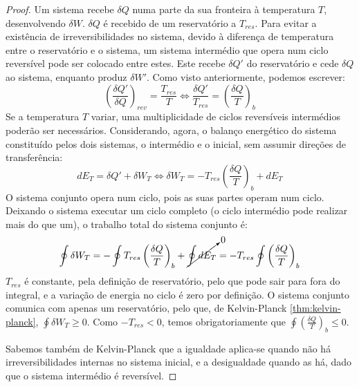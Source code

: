 \begin{proof}
    Um sistema recebe $\delta Q$ numa parte da sua fronteira à temperatura $T$, desenvolvendo $\delta W$. $\delta Q$ é recebido de um reservatório a $T_{res}$. Para evitar a existência de irreversibilidades no sistema, devido à diferença de temperatura entre o reservatório e o sistema, um sistema intermédio que opera num ciclo reversível pode ser colocado entre estes. Este recebe $\delta Q'$ do reservatório e cede $\delta Q$ ao sistema, enquanto produz $\delta W'$.
    Como visto anteriormente, podemos escrever:
    \begin{equation*}
        \left( \frac{\delta Q'}{\delta Q} \right)_{rev} = \frac{T_{res}}{T} \Longleftrightarrow \frac{\delta Q'}{T_{res}} = \left( \frac{\delta Q}{T} \right)_b
    \end{equation*}
    Se a temperatura $T$ variar, uma multiplicidade de ciclos reversíveis intermédios poderão ser necessários.
    Considerando, agora, o balanço energético do sistema constituído pelos dois sistemas, o intermédio e o inicial, sem assumir direções de transferência:
    \begin{equation*}
        d E_T = \delta Q' + \delta W_T \Longleftrightarrow \delta W_T = - T_{res} \left( \frac{\delta Q}{T} \right)_b + d E_T
    \end{equation*}
    O sistema conjunto opera num ciclo, pois as suas partes operam num ciclo. Deixando o sistema executar um ciclo completo (o ciclo intermédio pode realizar mais do que um), o trabalho total do sistema conjunto é:
    \begin{equation*}
        \oint \delta W_T = - \oint T_{res} \left( \frac{\delta Q}{T} \right)_b + \cancelto{0}{\oint d E_T} = - T_{res} \oint \left( \frac{\delta Q}{T} \right)_b
    \end{equation*}
    $T_{res}$ é constante, pela definição de reservatório, pelo que pode sair para fora do integral, e a variação de energia no ciclo é zero por definição.
    O sistema conjunto comunica com apenas um reservatório, pelo que, de Kelvin-Planck \autoref{thm:kelvin-planck}, $\oint \delta W_T \geq 0$. Como $- T_{res} < 0$, temos obrigatoriamente que $\oint \left( \frac{\delta Q}{T} \right)_b \leq 0$.
    
    Sabemos também de Kelvin-Planck que a igualdade aplica-se quando não há irreversibilidades internas no sistema inicial, e a desigualdade quando as há, dado que o sistema intermédio é reversível.
\end{proof}


